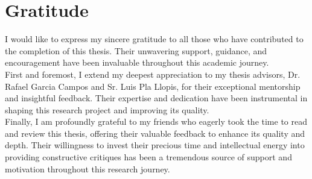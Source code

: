 \chapter*{Gratitude}

I would like to express my sincere gratitude to all those who have contributed to the completion of this thesis.
Their unwavering support, guidance, and encouragement have been invaluable throughout this academic journey. \\

First and foremost,
I extend my deepest appreciation to my thesis advisors, Dr. Rafael Garcia Campos and Sr. Luis Pla Llopis,
for their exceptional mentorship and insightful feedback.
Their expertise and dedication have been instrumental in shaping this research project and improving its quality. \\

Finally, I am profoundly grateful to my friends who eagerly took the time to read and review this thesis,
offering their valuable feedback to enhance its quality and depth.
Their willingness to invest their precious time and intellectual energy into providing constructive critiques
has been a tremendous source of support and motivation throughout this research journey.
